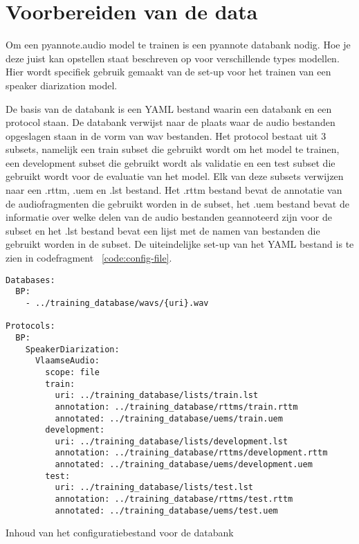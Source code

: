 \section{Voorbereiden van de data}
\label{sec:data}
Om een pyannote.audio model te trainen is een pyannote databank nodig. Hoe je deze juist kan opstellen staat beschreven op \textcite{BredinDatabase} voor verschillende types modellen. Hier wordt specifiek gebruik gemaakt van de set-up voor het trainen van een speaker diarization model.

De basis van de databank is een YAML bestand waarin een databank en een protocol staan. De databank verwijst naar de plaats waar de audio bestanden opgeslagen staan in de vorm van wav bestanden. Het protocol bestaat uit 3 subsets, namelijk een train subset die gebruikt wordt om het model te trainen, een development subset die gebruikt wordt als validatie en een test subset die gebruikt wordt voor de evaluatie van het model. Elk van deze subsets verwijzen naar een .rttm, .uem en .lst bestand. Het .rttm bestand bevat de annotatie van de audiofragmenten die gebruikt worden in de subset, het .uem bestand bevat de informatie over welke delen van de audio bestanden geannoteerd zijn voor de subset en het .lst bestand bevat een lijst met de namen van bestanden die gebruikt worden in de subset. De uiteindelijke set-up van het YAML bestand is te zien in codefragment ~\ref{code:config-file}.

\begin{listing}
    \begin{verbatim}
Databases:
  BP: 
    - ../training_database/wavs/{uri}.wav

Protocols:
  BP:
    SpeakerDiarization:
      VlaamseAudio:
        scope: file
        train:
          uri: ../training_database/lists/train.lst
          annotation: ../training_database/rttms/train.rttm
          annotated: ../training_database/uems/train.uem
        development:
          uri: ../training_database/lists/development.lst
          annotation: ../training_database/rttms/development.rttm
          annotated: ../training_database/uems/development.uem
        test:
          uri: ../training_database/lists/test.lst
          annotation: ../training_database/rttms/test.rttm
          annotated: ../training_database/uems/test.uem
    \end{verbatim}
	\caption[Configuratie databank]{\label{code:config-file}Inhoud van het configuratiebestand voor de databank}
\end{listing}

